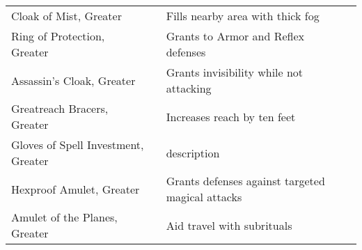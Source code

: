 \begin{longtabuwrapper}
\begin{longtabu}{l l X l}
Cloak of Mist, Greater &  & Fills nearby area with thick fog & \pageref{item:Cloak of Mist, Greater} \\
Ring of Protection, Greater &  & Grants  to Armor and Reflex defenses & \pageref{item:Ring of Protection, Greater} \\
Assassin's Cloak, Greater &  & Grants invisibility while not attacking & \pageref{item:Assassin's Cloak, Greater} \\
Greatreach Bracers, Greater &  & Increases reach by ten feet & \pageref{item:Greatreach Bracers, Greater} \\
Gloves of Spell Investment, Greater &  & description & \pageref{item:Gloves of Spell Investment, Greater} \\
Hexproof Amulet, Greater &  & Grants  defenses against targeted magical attacks & \pageref{item:Hexproof Amulet, Greater} \\
Amulet of the Planes, Greater &  & Aid travel with  subrituals & \pageref{item:Amulet of the Planes, Greater} \\
\end{longtabu}
\end{longtabuwrapper}
